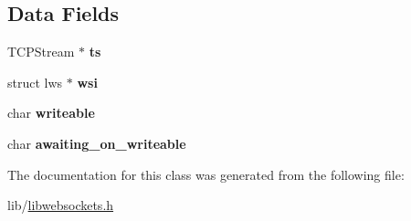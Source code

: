 \subsection*{Data Fields}
\begin{DoxyCompactItemize}
\item 
T\+C\+P\+Stream $\ast$ {\bfseries ts}\hypertarget{classlws__conn_a5cad031b6b779da42b37f4007cae541b}{}\label{classlws__conn_a5cad031b6b779da42b37f4007cae541b}

\item 
struct lws $\ast$ {\bfseries wsi}\hypertarget{classlws__conn_a7e504bd449ffb51c7ab1d2126613ebc3}{}\label{classlws__conn_a7e504bd449ffb51c7ab1d2126613ebc3}

\item 
char {\bfseries writeable}\hypertarget{classlws__conn_a8e1fdd467b7f66fc438dc70ae979b938}{}\label{classlws__conn_a8e1fdd467b7f66fc438dc70ae979b938}

\item 
char {\bfseries awaiting\+\_\+on\+\_\+writeable}\hypertarget{classlws__conn_a5226010afdf5421f279454e5cbb282a4}{}\label{classlws__conn_a5226010afdf5421f279454e5cbb282a4}

\end{DoxyCompactItemize}


The documentation for this class was generated from the following file\+:\begin{DoxyCompactItemize}
\item 
lib/\hyperlink{libwebsockets_8h}{libwebsockets.\+h}\end{DoxyCompactItemize}
